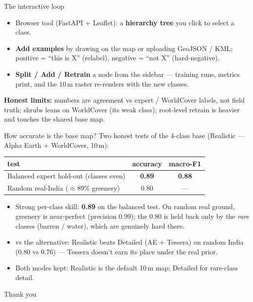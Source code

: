 \documentclass[aspectratio=169]{beamer}
\begin{document}
\begin{frame}{The interactive loop}
\begin{itemize}
  \item Browser tool (FastAPI + Leaflet): a \textbf{hierarchy tree} you click to select a
  class.
  \item \textbf{Add examples} by drawing on the map or uploading GeoJSON / KML; positive
  = ``this is X'' (relabel), negative = ``not X'' (hard-negative).
  \item \textbf{Split / Add / Retrain} a node from the sidebar --- training runs, metrics
  print, and the 10\,m raster re-renders with the new classes.
\end{itemize}
\vspace{0.6em}
\textbf{Honest limits:} numbers are agreement vs expert / WorldCover labels, not field
truth; shrubs leans on WorldCover (its weak class); root-level retrain is heavier and
touches the shared base map.
\end{frame}

\begin{frame}{How accurate is the base map?}
Two honest tests of the 4-class base (Realistic --- Alpha Earth $+$ WorldCover, 10\,m):
\vspace{0.4em}
\centering
\small
\begin{tabular}{l c c}
\toprule
\textbf{test} & \textbf{accuracy} & \textbf{macro-F1} \\
\midrule
Balanced expert hold-out (classes even) & \textbf{0.89} & \textbf{0.88} \\
Random real-India ($\approx$89\% greenery) & 0.80 & --- \\
\bottomrule
\end{tabular}
\vspace{0.8em}
\flushleft
\begin{itemize}\small
  \item Strong per-class skill: \textbf{0.89} on the balanced test. On random real ground,
  greenery is near-perfect (precision 0.99); the 0.80 is held back only by the \emph{rare}
  classes (barren / water), which are genuinely hard there.
  \item vs the alternative: Realistic beats Detailed (AE $+$ Tessera) on random India
  (0.80 vs 0.76) --- Tessera doesn't earn its place under the real prior.
  \item Both modes kept: Realistic is the default 10\,m map; Detailed for rare-class detail.
\end{itemize}
\end{frame}

\begin{frame}
\centering
\Large Thank you 
\end{frame}
\end{document}
